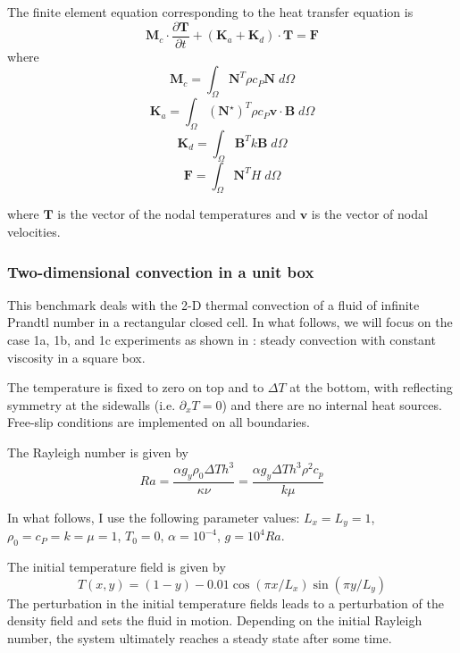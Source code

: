 The finite element equation corresponding to the heat transfer equation is
\[
{\bm M}_c\cdot \frac{\partial {\bm T}}{\partial t} + ({\bm K}_a  + {\bm K}_d)\cdot {\bm T} = {\bm F} 
\]
where
\[
{\bm M}_c=\int_\Omega {\bm N}^T \rho c_P {\bm N} \; d\Omega
\] 
\begin{equation}
{\bm K}_a=\int_\Omega ({\bm N}^\star)^T \rho c_P  {\bm v}\cdot{\bm B} \; d\Omega \label{advmat}
\end{equation}
\[
{\bm K}_d=\int_\Omega {\bm B}^T k {\bm B} \; d\Omega
\] 
\[
{\bm F}=\int_\Omega {\bm N}^T  H \; d\Omega
\]

where ${\bm T}$ is the vector of the nodal temperatures and ${\bm v}$ is the vector of nodal velocities.



\subsubsection{Two-dimensional convection in a unit box}

This benchmark deals with the 2-D thermal convection of a fluid 
of infinite Prandtl number in a rectangular closed cell.
In what follows, we will focus on the case 1a, 1b, and 1c experiments as shown in \cite{blbc89}:
steady convection with constant viscosity in a square box.

The temperature is fixed to zero on top and to $\Delta T$ at the bottom, 
with reflecting symmetry at the sidewalls (i.e. $\partial_x T=0$) 
and there are no internal heat sources. 
Free-slip conditions are implemented on all boundaries. 

The Rayleigh number is given by
\begin{equation}
Ra = \frac{\alpha g_y \rho_0 \Delta T h^3 }{\kappa \nu}
=\frac{\alpha g_y \Delta T h^3 \rho^2 c_p}{k \mu}
\end{equation}

In what follows, I use the following parameter values:  
$L_x=L_y=1$,$\rho_0=c_P=k=\mu=1$, $T_0=0$, $\alpha=10^{-4}$, $g=10^{4}Ra$.

The initial temperature field is given by 
\begin{equation}
T(x,y)=(1-y) - 0.01\cos(\pi x/L_x) \sin(\pi y/L_y)
\end{equation}
The perturbation in the initial temperature fields leads to 
a perturbation of the density field and sets the fluid in motion. 
Depending on the initial Rayleigh number, the system ultimately reaches a 
steady state after some time. 


